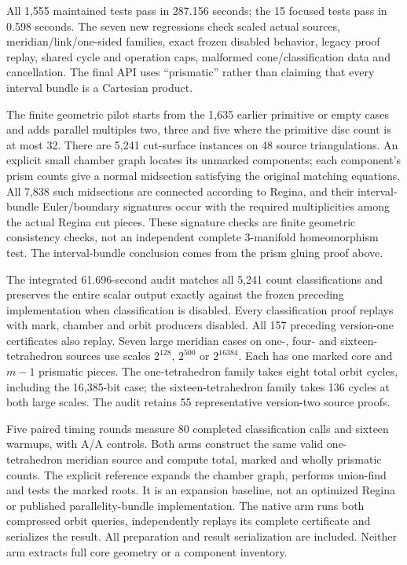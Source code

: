 All 1,555 maintained tests pass in 287.156 seconds; the 15 focused tests pass
in 0.598 seconds. The seven new regressions check scaled actual sources,
meridian/link/one-sided families, exact frozen disabled behavior, legacy
proof replay, shared cycle and operation caps, malformed cone/classification
data and cancellation. The final API uses ``prismatic'' rather than claiming
that every interval bundle is a Cartesian product.

The finite geometric pilot starts from the 1,635 earlier primitive or empty
cases and adds parallel multiples two, three and five where the primitive
disc count is at most 32. There are 5,241 cut-surface instances on 48 source
triangulations. An explicit small chamber graph locates its unmarked components;
each component's prism counts give a normal midsection satisfying the original
matching equations. All 7,838 such midsections are connected according to
Regina, and their interval-bundle Euler/boundary signatures occur with the
required multiplicities among the actual Regina cut pieces.
These signature checks are finite geometric consistency checks, not an
independent complete 3-manifold homeomorphism test. The interval-bundle
conclusion comes from the prism gluing proof above.

The integrated 61.696-second audit matches all 5,241 count classifications
and preserves the entire scalar output exactly against the frozen preceding
implementation when classification is disabled. Every classification proof
replays with mark, chamber and orbit producers disabled. All 157 preceding
version-one certificates also replay. Seven large meridian cases on one-,
four- and sixteen-tetrahedron sources use scales $2^{128}$, $2^{500}$ or
$2^{16384}$. Each has one marked core and $m-1$ prismatic pieces. The
one-tetrahedron family takes eight total orbit cycles, including the
16,385-bit case; the sixteen-tetrahedron family takes 136 cycles at both
large scales. The audit retains 55 representative version-two source proofs.

Five paired timing rounds measure 80 completed classification calls and
sixteen warmups, with A/A controls. Both arms construct the same valid
one-tetrahedron meridian source and compute total, marked and wholly prismatic
counts. The explicit reference expands the chamber graph, performs union-find
and tests the marked roots. It is an expansion baseline, not an optimized
Regina or published parallelity-bundle implementation. The native arm runs
both compressed orbit queries, independently replays its complete certificate
and serializes the result. All preparation and result serialization are
included. Neither arm extracts full core geometry or a component inventory.


